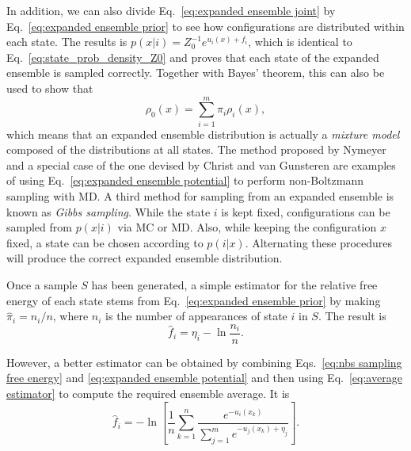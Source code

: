\documentclass[aip,jcp,reprint,amsmath,amssymb]{revtex4-1}
\begin{document}
In addition, we can also divide Eq.~\eqref{eq:expanded ensemble joint} by Eq.~\eqref{eq:expanded ensemble prior} to see how configurations are distributed within each state. The results is $p(x|i) = Z_0^{-1} e^{u_i(x) + f_i}$, which is identical to Eq.~\eqref{eq:state_prob_density_Z0} and proves that each state of the expanded ensemble is sampled correctly. Together with Bayes' theorem, this can also be used to show that
\begin{equation}
\rho_0(x) = \sum_{i=1}^m \pi_i \rho_i(x),
\end{equation}
which means that an expanded ensemble distribution is actually a \textit{mixture model}\cite{Lindsay_1995, Marin_2005} composed of the distributions at all states. The method proposed by Nymeyer\cite{Nymeyer_2010} and a special case of the one devised by Christ and van Gunsteren\cite{Christ_2007, *Christ_2008, *Christ_2009} are examples of using Eq.~\eqref{eq:expanded ensemble potential} to perform non-Boltzmann sampling with MD. A third method for sampling from an expanded ensemble is known as \textit{Gibbs sampling}.\cite{Marin_2005, Chodera_2011} While the state $i$ is kept fixed, configurations can be sampled from $p(x|i)$ via MC or MD. Also, while keeping the configuration $x$ fixed, a state can be chosen according to $p(i|x)$. Alternating these procedures will produce the correct expanded ensemble distribution.\cite{Chodera_2011}

Once a sample $S$ has been generated, a simple estimator for the relative free energy of each state stems from Eq.~\eqref{eq:expanded ensemble prior} by making $\hat \pi_i = n_i/n$, where $n_i$ is the number of appearances of state $i$ in $S$. The result is
\begin{equation}
\hat f_i = \eta_i - \ln \frac{n_i}{n}.
\end{equation}

However, a better estimator can be obtained by combining Eqs.~\eqref{eq:nbs sampling free energy} and \eqref{eq:expanded ensemble potential} and then using Eq.~\eqref{eq:average estimator} to compute the required ensemble average. It is
\begin{equation}
\hat f_i = -\ln \left[ \frac{1}{n}\sum_{k=1}^n \frac{e^{-u_i(x_k)}}{\sum_{j=1}^m e^{-u_j(x_k) + \eta_j}} \right].
\end{equation}
\end{document}
